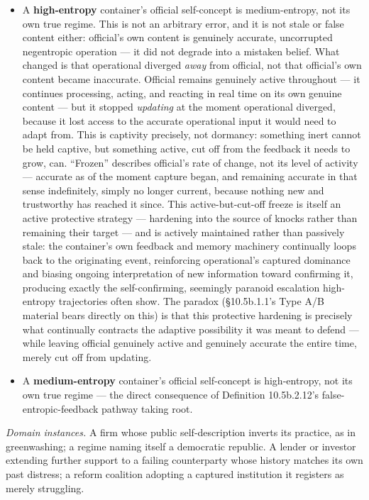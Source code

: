 \documentclass[
]{article}
\begin{document}
\begin{itemize}
\item
  A \textbf{high-entropy} container's official self-concept is
  medium-entropy, not its own true regime. This is not an arbitrary
  error, and it is not stale or false content either: official's own
  content is genuinely accurate, uncorrupted negentropic operation ---
  it did not degrade into a mistaken belief. What changed is that
  operational diverged \emph{away} from official, not that official's
  own content became inaccurate. Official remains genuinely active
  throughout --- it continues processing, acting, and reacting in real
  time on its own genuine content --- but it stopped \emph{updating} at
  the moment operational diverged, because it lost access to the
  accurate operational input it would need to adapt from. This is
  captivity precisely, not dormancy: something inert cannot be held
  captive, but something active, cut off from the feedback it needs to
  grow, can. ``Frozen'' describes official's rate of change, not its
  level of activity --- accurate as of the moment capture began, and
  remaining accurate in that sense indefinitely, simply no longer
  current, because nothing new and trustworthy has reached it since.
  This active-but-cut-off freeze is itself an active protective strategy
  --- hardening into the source of knocks rather than remaining their
  target --- and is actively maintained rather than passively stale: the
  container's own feedback and memory machinery continually loops back
  to the originating event, reinforcing operational's captured dominance
  and biasing ongoing interpretation of new information toward
  confirming it, producing exactly the self-confirming, seemingly
  paranoid escalation high-entropy trajectories often show. The paradox
  (§10.5b.1.1's Type A/B material bears directly on this) is that this
  protective hardening is precisely what continually contracts the
  adaptive possibility it was meant to defend --- while leaving official
  genuinely active and genuinely accurate the entire time, merely cut
  off from updating.
\item
  A \textbf{medium-entropy} container's official self-concept is
  high-entropy, not its own true regime --- the direct consequence of
  Definition 10.5b.2.12's false-entropic-feedback pathway taking root.
\end{itemize}

\emph{Domain instances.} A firm whose public self-description inverts
its practice, as in greenwashing; a regime naming itself a democratic
republic. A lender or investor extending further support to a failing
counterparty whose history matches its own past distress; a reform
coalition adopting a captured institution it registers as merely
struggling.
\end{document}

